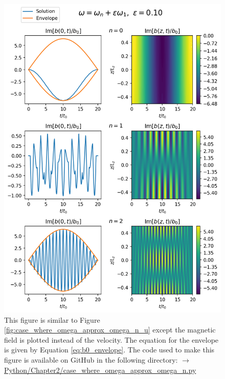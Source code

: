 \begin{figure}
    \centering
    \vspace{-20pt}
    \includegraphics[width=\textwidth,height=0.9\textheight,keepaspectratio]{figures/chapter02/case_where_omega_approx_omega_n_b.png}
    \vspace{-10pt}
    \caption{This figure is similar to Figure \ref{fig:case_where_omega_approx_omega_n_u} except the magnetic field is plotted instead of the velocity. The equation for the envelope is given by Equation \eqref{eq:b0_envelope}. The code used to make this figure is available on GitHub in the following directory:\newline
    \href{https://github.com/aleksyprok/apkp_thesis/blob/main/Python/Chapter2/case_where_omega_approx_omega_n.py}{$\rightarrow$ Python/Chapter2/case\_where\_omega\_approx\_omega\_n.py}}
    \vspace{-30pt}
    \label{fig:case_where_omega_approx_omega_n_b}
\end{figure}


